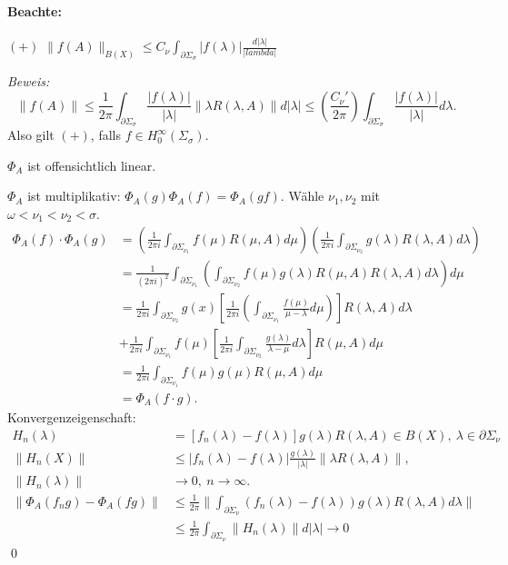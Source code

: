 \documentclass[12pt]{extreport} %
\numberwithin{equation}{section}
\newcommand{\om}{\omega}
\newcommand{\m}{\cdot}
\newcommand{\Bew}{\emph{Beweis: }}
\begin{document}
	\paragraph{Beachte:}$(+)$ $\|f(A)\|_{B(X)} \leq C_\nu \int_{\partial \Sigma_\sigma} |f(\lambda)|\frac{d|\lambda|}{|lambda|}$
	
	\Bew 
	$$\|f(A)\|\leq \frac{1}{2\pi} \int_{\partial\Sigma_\sigma} \frac{|f(\lambda)|}{|\lambda|} \|\lambda R(\lambda, A)\| d|\lambda| \leq \left(\frac{C_\nu'}{2\pi} \right) \int_{\partial\Sigma_\sigma} \frac{|f(\lambda)|}{|\lambda|} d\lambda.$$
	 Also gilt $(+)$, falls $f\in H_0^\infty(\Sigma_\sigma)$.
	 
	 $\Phi_A$ ist offensichtlich linear.
	 
	 $\Phi_A$ ist multiplikativ: $\Phi_A(g)\Phi_A(f) = \Phi_A(gf)$. Wähle $\nu_1,\nu_2$ mit $\om <\nu_1 <\nu_2 <\sigma$. 
	 \begin{align*}
	 	\Phi_A(f)\m \Phi_A(g) &= \left(\frac{1}{2\pi i} \int_{\partial\Sigma_{\nu_1}} f(\mu) R(\mu,A) d\mu \right) \left(\frac{1}{2\pi i}\int_{\partial \Sigma_{\nu_2}} g(\lambda) R(\lambda, A) d\lambda \right)\\
	 	&= \frac{1}{(2\pi i)^2} \int_{\partial \Sigma_{\nu_1}} \left(
	 	\int_{\partial\Sigma_{\nu_2}}f(\mu) g(\lambda) R(\mu,A) R(\lambda,A) d\lambda \right)d\mu \\
	 	&=\frac{1}{2\pi i}\int_{\partial\Sigma_{\nu_2}} g(x) \left[\frac{1}{2\pi i} \left(\int_{\partial\Sigma_{\nu_1}} \frac{f(\mu)}{\mu-\lambda} d\mu \right) \right]R(\lambda, A) d\lambda\\
	 	&+\frac{1}{2\pi i} \int_{\partial\Sigma_{\nu_1}} f(\mu) \left[\frac{1}{2\pi i} \int_{\partial\Sigma_{\nu_2}} \frac{g(\lambda)}{\lambda-\mu} d\lambda \right]R(\mu,A) d\mu\\
	 	&= \frac{1}{2\pi i} \int_{\partial\Sigma_{\nu_1}} f(\mu)g(\mu) R(\mu, A) d\mu\\
	 	&= \Phi_A(f\m g).
	 \end{align*}
	 Konvergenzeigenschaft:
	 \begin{align*}
	 	H_n(\lambda) &= \left[f_n(\lambda) - f(\lambda) \right] g(\lambda) R(\lambda, A) \in B(X),~ \lambda\in \partial\Sigma_\nu\\
	 	\|H_n(X)\| &\leq |f_n(\lambda) - f(\lambda)| \frac{g(\lambda)}{|\lambda|} \|\lambda R(\lambda, A)\|,\\
	 	\|H_n(\lambda)\|&\rightarrow 0, ~ n\rightarrow \infty.\\
	 	\|\Phi_A(f_n g)- \Phi_A(fg) \| &\leq  \frac{1}{2\pi} \| \int_{\partial\Sigma_\nu} (f_n(\lambda) - f(\lambda)) g(\lambda) R(\lambda, A) d\lambda\| \\
	 	&\leq \frac{1}{2\pi} \int_{\partial \Sigma_\nu} \|H_n(\lambda)\| d|\lambda|\rightarrow 0
	 \end{align*}
	 \qed
	 
\end{document}
